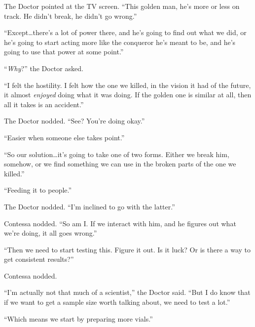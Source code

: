 The Doctor pointed at the TV screen.  ``This golden man, he's more or less on track.  He didn't break, he didn't go wrong.''



``Except\ldots there's a lot of power there, and he's going to find out what we did, or he's going to start acting more like the conqueror he's meant to be, and he's going to use that power at some point.''



``\emph{Why}?'' the Doctor asked.



``I felt the hostility.  I felt how the one we killed, in the vision it had of the future, it almost \emph{enjoyed} doing what it was doing.  If the golden one is similar at all, then all it takes is an accident.''



The Doctor nodded.  ``See?  You're doing okay.''



``Easier when someone else takes point.''



``So our solution\ldots it's going to take one of two forms.  Either we break him, somehow, or we find something we can use in the broken parts of the one we killed.''



``Feeding it to people.''



The Doctor nodded.  ``I'm inclined to go with the latter.''



Contessa nodded.  ``So am I.  If we interact with him, and he figures out what we're doing, it all goes wrong.''



``Then we need to start testing this.  Figure it out.  Is it luck?  Or is there a way to get consistent results?''



Contessa nodded.



``I'm actually not that much of a scientist,'' the Doctor said.  ``But I do know that if we want to get a sample size worth talking about, we need to test a lot.''



``Which means we start by preparing more vials.''



\blacksquare



